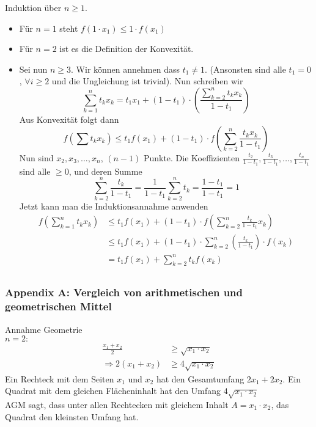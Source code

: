 \begin{beweis}{5.44}
Induktion über $n\geq 1$.\\
\begin{itemize}
\item Für $n=1$ steht $f(1\cdot x_1)\leq 1\cdot f(x_1)$ \checkmark
\item Für $n=2$ ist es die Definition der Konvexität.
\item Sei nun $n\geq 3$. Wir können annehmen dass $t_1\not=1$. (Ansonsten sind alle $t_1=0$, $\forall i\geq 2$ und die Ungleichung ist trivial). Nun schreiben wir
\[\sum\limits_{k = 1}^n {{t_k}{x_k}}  = {t_1}{x_1} + \left( {1 - {t_1}} \right) \cdot \left( {\frac{{\sum\limits_{k = 2}^n {{t_k}{x_k}} }}{{1 - {t_1}}}} \right)\]
Aus Konvexität folgt dann
\[f\left( \sum t_kx_k \right)\leq t_1f(x_1)+\left( 1-t_1\right)\cdot f\left( \sum\limits_{k=2}^n \frac{t_k x_k}{1-t_1}\right)\]
Nun sind $x_2,x_3,\dots, x_n$, $(n-1)$ Punkte. Die Koeffizienten $\frac{t_2}{1-t_1},\frac{t_3}{1-t_1},\dots,\frac{t_n}{1-t_1}$ sind alle $\geq 0$, und deren Summe
\[\sum\limits_{k = 2}^n {\frac{{{t_k}}}{{1 - {t_1}}}}  = \frac{1}{{1 - {t_1}}}\sum\limits_{k = 2}^n {{t_k}}  = \frac{{1 - {t_1}}}{{1 - {t_1}}} = 1\]
Jetzt kann man die Induktionsannahme anwenden
\begin{align*}
f\left( \sum\limits_{k = 1}^n {{t_k}{x_k}} \right)&\leq t_1f(x_1)+\left( 1-t_1\right)\cdot f\left( \sum\limits_{k = 2}^n \frac{t_k}{1-t_1}x_k\right)\\
&\leq t_1f(x_1)+\left( 1-t_1\right)\cdot\sum\limits_{k = 2}^n \left(\frac{t_k}{1-t_1}\right)\cdot f(x_k)\\
&= t_1f(x_1)+\sum\limits_{k = 2}^n t_k f(x_k)\\
\end{align*}
\end{itemize}
\end{beweis}

\newpage
\subsubsection*{Appendix A: Vergleich von arithmetischen und geometrischen Mittel}
Annahme Geometrie \\
$n=2:$
\begin{align*}
\frac{x_1+x_2}{2}&\geq\sqrt{x_1\cdot x_2}\\
\Rightarrow 2(x_1+x_2)&\geq 4\sqrt{x_1\cdot x_2}
\end{align*}
Ein Rechteck mit dem Seiten $x_1$ und $x_2$ hat den Gesamtumfang $2x_1+2x_2$. Ein Quadrat mit dem gleichen Flächeninhalt hat den Umfang $4\sqrt{x_1\cdot x_2}$\\

AGM sagt, dass unter allen Rechtecken mit gleichem Inhalt $A=x_1\cdot x_2$, das Quadrat den kleinsten Umfang hat.




